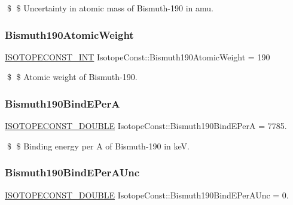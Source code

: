 \$ \$ Uncertainty in atomic mass of Bismuth-\/190 in amu. \mbox{\label{group___isotope_const-_bismuth-_bi190_ga9314f9b360250545c62c43aee2e7de9d}} 
\subsubsection{\texorpdfstring{Bismuth190\+Atomic\+Weight}{Bismuth190AtomicWeight}}
{\footnotesize\ttfamily \mbox{\hyperlink{group___isotope_const-_macros_ga5f18360b3e99483a35c32d789e62621c}{I\+S\+O\+T\+O\+P\+E\+C\+O\+N\+S\+T\+\_\+\+I\+NT}} Isotope\+Const\+::\+Bismuth190\+Atomic\+Weight = 190}

\$ \$ Atomic weight of Bismuth-\/190. \mbox{\label{group___isotope_const-_bismuth-_bi190_gac12846109f4edfb7ef189cade7a71266}} 
\subsubsection{\texorpdfstring{Bismuth190\+Bind\+E\+PerA}{Bismuth190BindEPerA}}
{\footnotesize\ttfamily \mbox{\hyperlink{group___isotope_const-_macros_ga8f45a7272ce02c0b4c65c44636ed719a}{I\+S\+O\+T\+O\+P\+E\+C\+O\+N\+S\+T\+\_\+\+D\+O\+U\+B\+LE}} Isotope\+Const\+::\+Bismuth190\+Bind\+E\+PerA = 7785.}

\$ \$ Binding energy per A of Bismuth-\/190 in keV. \mbox{\label{group___isotope_const-_bismuth-_bi190_gacf0188c48d3dcb78844663c1c12f204a}} 
\subsubsection{\texorpdfstring{Bismuth190\+Bind\+E\+Per\+A\+Unc}{Bismuth190BindEPerAUnc}}
{\footnotesize\ttfamily \mbox{\hyperlink{group___isotope_const-_macros_ga8f45a7272ce02c0b4c65c44636ed719a}{I\+S\+O\+T\+O\+P\+E\+C\+O\+N\+S\+T\+\_\+\+D\+O\+U\+B\+LE}} Isotope\+Const\+::\+Bismuth190\+Bind\+E\+Per\+A\+Unc = 0.}

